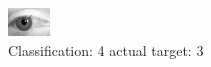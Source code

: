 \begin{figure}[h!]
\begin{center}
\includegraphics[width=0.60\columnwidth]{figures/ID2796_class_4_target_3.png}
\end{center}
\caption{ Classification: 4 actual target: 3}
\label{fig:ID2796_class_4_target_3}
\end{figure}
